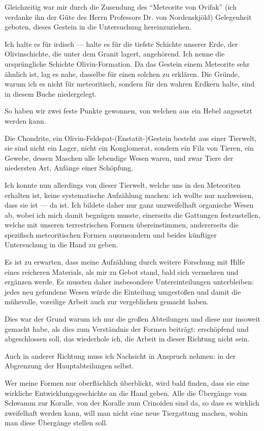\documentclass[a4paper, 12pt, oneside]{article}
\begin{document}
Gleichzeitig war mir durch die Zusendung des "`Meteorite von Ovifak"' (ich verdanke ihn der Güte des Herrn Professors Dr. von Nordenskjöld) Gelegenheit geboten, dieses Gestein in die Untersuchung hereinzuziehen.

Ich halte es für irdisch — halte es für die tiefste Schichte unserer Erde, der Olivinschichte, die unter dem Granit lagert, angehörend. Ich nenne die ursprüngliche Schichte Olivin-Formation. Da das Gestein einem Meteorite sehr ähnlich ist, lag es nahe, dasselbe für einen solchen zu erklären. Die Gründe, warum ich es nicht für meteoritisch, sondern für den wahren Erdkern halte, sind in diesem Buche niedergelegt.

So haben wir zwei feste Punkte gewonnen, von welchen aus ein Hebel angesetzt werden kann.

Die Chondrite, ein Olivin-Feldspat-(Enstatit-)Gestein besteht aus einer Tierwelt, sie sind nicht ein Lager, nicht ein Konglomerat, sondern ein Filz von Tieren, ein Gewebe, dessen Maschen alle lebendige Wesen waren, und zwar Tiere der niedersten Art, Anfänge einer Schöpfung.

Ich konnte nun allerdings von dieser Tierwelt, welche uns in den Meteoriten erhalten ist, keine systematische Aufzählung machen: ich wollte nur nachweisen, dass sie ist — da ist. Ich bildete daher nur ganz unzweifelhaft organische Wesen ab, wobei ich mich damit begnügen musste, einerseits die Gattungen festzustellen, welche mit unseren terrestrischen Formen übereinstimmen, andererseits die spezifisch meteoritischen Formen auszusondern und beides künftiger Untersuchung in die Hand zu geben.

Es ist zu erwarten, dass meine Aufzählung durch weitere Forschung mit Hilfe eines reicheren Materials, als mir zu Gebot stand, bald sich vermehren und ergänzen werde. Es mussten daher insbesondere Untereinteilungen unterbleiben: jedes neu gefundene Wesen würde die Einteilung umgestoßen und damit die mühevolle, voreilige Arbeit auch zur vergeblichen gemacht haben.

Dies war der Grund warum ich nur die großen Abteilungen und diese nur insoweit gemacht habe, als dies zum Verständnis der Formen beiträgt: erschöpfend und abgeschlossen soll, das wiederhole ich, die Arbeit in dieser Richtung nicht sein.

Auch in anderer Richtung muss ich Nachsicht in Anspruch nehmen: in der Abgrenzung der Hauptabteilungen selbst.

Wer meine Formen nur oberflächlich überblickt, wird bald finden, dass sie eine wirkliche Entwicklungsgeschichte an die Hand geben. Alle die Übergänge vom Schwamm zur Koralle, von der Koralle zum Crinoiden sind da, so dass es wirklich zweifelhaft werden kann, will man nicht eine neue Tiergattung machen, wohin man diese Übergänge stellen soll.
\end{document}
